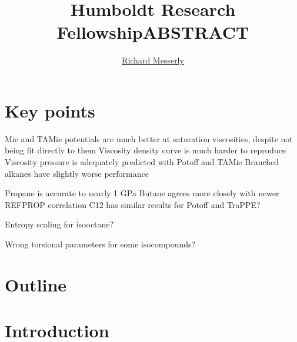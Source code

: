 \documentclass[11pt,a4paper]{article}
\begin{document}
	\thispagestyle{empty}
	\title{\Large \textbf{Humboldt Research Fellowship}}
	\author[1]{\large {\underline{Richard Messerly}}}%
	
	
	\date{} %
	\maketitle\thispagestyle{empty} %
	\begin{center}
		\title{\textbf{ABSTRACT}}\centering{}
	\end{center}
	\justify
	
\section*{Key points}

Mie and TAMie potentials are much better at saturation viscosities, despite not being fit directly to them
Viscosity density curve is much harder to reproduce
Viscosity pressure is adequately predicted with Potoff and TAMie
Branched alkanes have slightly worse performance

Propane is accurate to nearly 1 GPa
Butane agrees more closely with newer REFPROP correlation
C12 has similar results for Potoff and TraPPE?

Entropy scaling for isooctane?

Wrong torsional parameters for some isocompounds?

\section*{Outline}

\section{Introduction}
\end{document}
